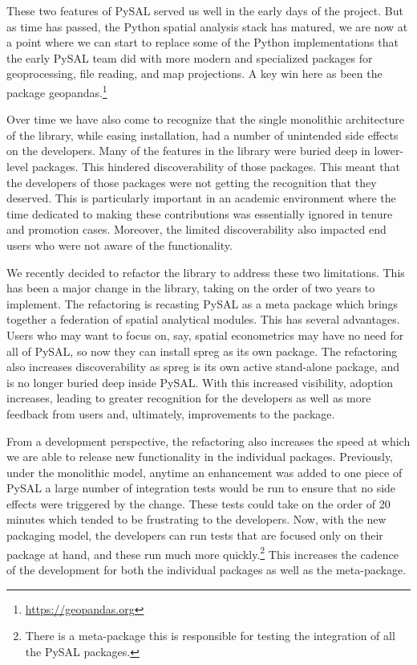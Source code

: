 \documentclass[11pt]{article}
\begin{document}
These two features of PySAL served us well in the early days of the project.
But as time has passed, the Python spatial analysis stack has matured, we are
now at a point where we can start to replace some of the Python implementations
that the early PySAL team did with more modern and specialized packages for
geoprocessing, file reading, and map projections. A key win here as been the
package geopandas.\footnote{\url{https://geopandas.org}}


Over time we have also come to recognize that the single monolithic
architecture of the library, while easing installation, had a number of
unintended side effects on the developers. Many of the features in the library
were buried deep in lower-level packages. This hindered discoverability of
those packages. This meant that the developers of those packages were not
getting the recognition that they deserved. This is particularly important in an
academic environment where the time dedicated to making these contributions was
essentially ignored in tenure and promotion cases. Moreover, the limited
discoverability also impacted end users who were not aware of the
functionality.


We recently decided to refactor the library to address these two limitations.
This has been a major change in the library, taking on the order of two years
to implement. The refactoring is recasting PySAL as a meta package which brings
together a federation of spatial analytical modules. This has several
advantages. Users who may want to focus on, say, spatial econometrics
may have no need for all of PySAL, so now they can install spreg as its own
package. The refactoring also increases discoverability as spreg is its own
active stand-alone package, and is no longer buried deep inside PySAL. With
this increased visibility, adoption increases, leading to greater recognition
for the developers as well as more feedback from users and, ultimately,
improvements to the package.

From a development perspective, the refactoring also increases the speed at
which we are able to release new functionality in the individual packages.
Previously, under the monolithic model, anytime an enhancement was
added to one piece of PySAL a large number of integration tests would be run to
ensure that no side effects were triggered by the change. These tests could
take on the order of 20 minutes which tended to be frustrating
to the developers. Now, with the new packaging model, the developers can run
 tests that are focused only on their package at hand, and these run much more
quickly.\footnote{There is a meta-package this is responsible for testing the
integration of all the PySAL packages.} This increases the cadence of the development for both
the individual packages as well as the meta-package.
\end{document}
